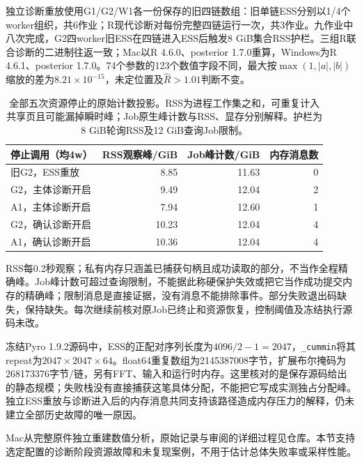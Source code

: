 独立诊断重放使用G1/G2/W1各一份保存的旧四链数组：旧单链ESS分别以1/4个worker组织，共6作业；R现代诊断对每份完整四链运行一次，共3作业。九作业中八次完成，G2四worker旧ESS在四链进入ESS后触发8 GiB集合RSS护栏。三组R联合诊断的二进制往返一致；Mac以R 4.6.0、posterior 1.7.0重算，Windows为R 4.6.1、posterior 1.7.0。74个参数的123个数值字段不同，最大按$\max(1,|a|,|b|)$缩放的差为$8.21\times10^{-15}$，未定位置及$\hat R>1.01$判断不变。

\begin{table}[htbp]\centering\small
\begin{tabular}{lrrr}\toprule
停止调用（均4w） & RSS观察峰/GiB & Job峰计数/GiB & 内存消息数\\\midrule
旧G2，ESS重放 & 8.85 & 11.63 & 0\\
G2，主体诊断开启 & 9.49 & 12.04 & 2\\
A1，主体诊断开启 & 7.94 & 12.60 & 1\\
G2，确认诊断开启 & 10.23 & 12.04 & 4\\
A1，确认诊断开启 & 10.36 & 12.04 & 4\\
\bottomrule\end{tabular}
\caption{全部五次资源停止的原始计数投影。RSS为进程工作集之和，可重复计入共享页且可能漏掉瞬时峰；Job原生峰计数与RSS、显存分别解释。护栏为8 GiB轮询RSS及12 GiB查询Job限制。}
\end{table}

RSS每0.2秒观察；私有内存只涵盖已捕获句柄且成功读取的部分，不当作全程精确峰。Job峰计数可超过查询限制，不能据此称硬保护失效或把它当作成功提交内存的精确峰；限制消息是直接证据，没有消息不能排除事件。部分失败退出码缺失，保持缺失。每次继续前核对原Job已终止和资源恢复，控制阈值及冻结执行源码未改。

冻结Pyro 1.9.2源码中，ESS的正配对序列长度为$4096/2-1=2047$，\texttt{\_cummin}将其repeat为$2047\times2047\times64$。float64重复数组为2145387008字节，扩展布尔掩码为268173376字节/链，另有FFT、输入和运行时内存。这里核对的是保存源码给出的静态规模；失败栈没有直接捕获这笔具体分配，不能把它写成实测独占分配峰。独立ESS重放与诊断进入后的内存消息共同支持该路径造成内存压力的解释，仍未建立全部历史故障的唯一原因。

Mac从完整原件独立重建数值分析，原始记录与审阅的详细过程见仓库。本节支持选定配置的诊断阶段资源故障和未复现案例，不用于估计总体失败率或采样性能。
